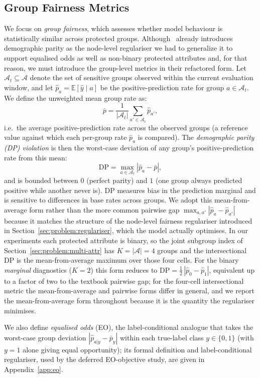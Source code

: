 \documentclass[sigconf,anonymous,review]{acmart}
\begin{document}
\subsection{Group Fairness Metrics}
We focus on \emph{group fairness}, which assesses whether model behaviour is statistically similar across protected groups. Although~\cite{chowdhury2024enhancing} already 
introduces demographic parity as the node-level regulariser we had to generalize it to support equalised odds as well as non-binary protected attributes and, for that reason,
we must introduce the group-level metrics in their refactored form.
Let $\mathcal{A}_t \subseteq \mathcal{A}$ denote the set
of sensitive groups observed within the current evaluation window, and let $\hat{p}_a = \mathbb{E}[\hat{y} \mid a]$ be the positive-prediction rate for group $a \in \mathcal{A}_t$.
We define the unweighted mean group rate as:
\[
\bar{p} = \frac{1}{|\mathcal{A}_t|}\sum_{a' \in \mathcal{A}_t}\hat{p}_{a'},
\]
i.e.\ the average positive-prediction rate across the observed groups (a reference value against which each per-group rate $\hat{p}_a$ is compared). The \emph{demographic parity
(DP) violation} is then the worst-case deviation of any group's positive-prediction rate from this mean:
\[
\mathrm{DP} = \max_{a \in \mathcal{A}_t}\left|\hat{p}_a - \bar{p}\right|,
\]
and is bounded between $0$ (perfect parity) and $1$ (one group always predicted positive while another never is). DP measures bias in the prediction marginal and is
sensitive to differences in base rates across groups. We adopt this mean-from-average form rather than the more common pairwise gap $\max_{a,a'}|\hat p_a - \hat p_{a'}|$
because it matches the structure of the node-level fairness regulariser introduced in Section~\ref{sec:problem:regulariser}, which the model actually optimises. In our
experiments each protected attribute is binary, so the joint subgroup index of Section~\ref{sec:problem:multi-attr} has $K=|\mathcal{A}|=4$ groups and the intersectional DP
is the mean-from-average maximum over those four cells. For the binary \emph{marginal} diagnostics ($K=2$) this form reduces to $\mathrm{DP}=\tfrac{1}{2}\,|\hat p_0 - \hat p_1|$,
equivalent up to a factor of two to the textbook pairwise gap; for the four-cell intersectional metric the mean-from-average and pairwise forms differ in general, and we report
the mean-from-average form throughout because it is the quantity the regulariser minimises.

We also define \emph{equalised odds} (EO), the label-conditional analogue that takes the worst-case group deviation $|\hat p_{a|y}-\bar p_y|$ within each true-label class
$y\in\{0,1\}$ (with $y{=}1$ alone giving equal opportunity); its formal definition and label-conditional regulariser, used by the deferred EO-objective study, are given in
Appendix~\ref{app:eo}.
\end{document}
